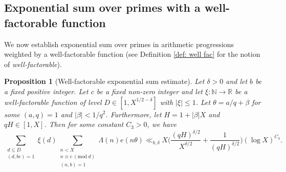 \documentclass[12pt]{amsart}
\numberwithin{equation}{section}
\newtheorem{prop}[theorem]{Proposition}
\theoremstyle{remark}
\theoremstyle{definition}
\newcommand{\imod}[1]{\ (\mathrm{mod}\ #1)}
\begin{document}
\subsection{Exponential sum over primes with a well-factorable function}
We now establish exponential sum over primes in arithmetic progressions weighted by a well-factorable function (see Definition \ref{def: well fac} for the notion of \emph{well-factorable}).

\begin{prop}[Well-factorable exponential sum estimate]\label{expwellfac}
Let $\delta>0$ and let $b$ be a fixed positive integer. Let $c$ be a fixed non-zero integer and let $\xi:\mathbb{N}\rightarrow\mathbb{R}$ be a well-factorable function of level $D\in [1, X^{1/2-\delta}]$ with $|\xi|\leq 1$. Let $\theta= a/q + \beta$ for some $(a, q)=1$ and $\lvert \beta\rvert <1/q^2$. Furthermore, let $H=1+|\beta|X$ and $qH\in [1, X]$. Then for some constant $C_3>0$, we have 
\begin{equation}
 \sum_{\substack{d\leq D\\(d,bc)=1}}\xi(d)\sum_{\substack{n<X\\n \equiv c \imod d\\(n, b)=1}}\Lambda(n)e(n\theta)\ll_{b, \delta}  X\bigg(\dfrac{(qH)^{\delta/2}}{X^{\delta/2}} + \dfrac{1}{(qH)^{\delta/2}}\bigg)(\log X)^{C_3}.
\end{equation}
\end{prop}
\end{document}
